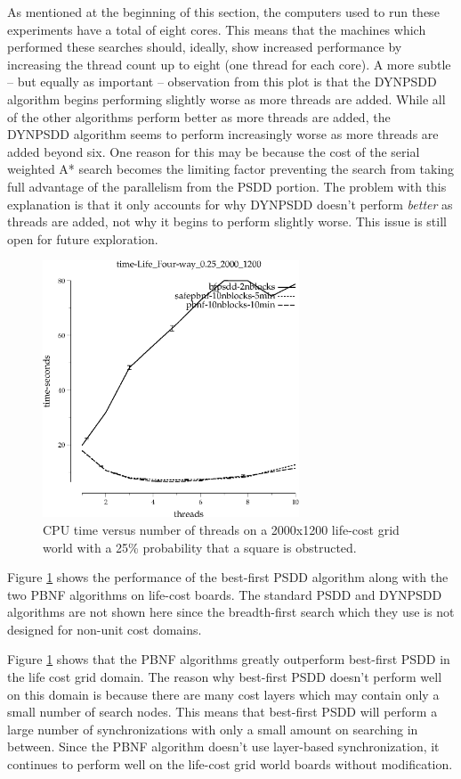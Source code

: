 \documentclass{article}
\begin{document}
As mentioned at the beginning of this section, the computers used to
run these experiments have a total of eight cores.  This means that
the machines which performed these searches should, ideally, show
increased performance by increasing the thread count up to eight (one
thread for each core).  A more subtle -- but equally as important --
observation from this plot is that the DYNPSDD algorithm begins
performing slightly worse as more threads are added.  While all of the
other algorithms perform better as more threads are added, the DYNPSDD
algorithm seems to perform increasingly worse as more threads are
added beyond six.  One reason for this may be because the cost of the
serial weighted A* search becomes the limiting factor preventing the
search from taking full advantage of the parallelism from the PSDD
portion.  The problem with this explanation is that it only accounts
for why DYNPSDD doesn't perform \emph{better} as threads are added,
not why it begins to perform slightly worse.  This issue is still open
for future exploration.

\begin{figure}[t]
\includegraphics[width=3in]{../graphs/grid_life_four-way_0.25_2000_1200/time-Life_Four-way_0.25_2000_1200.eps}
\caption{CPU time versus number of threads on a 2000x1200 life-cost
  grid world with a 25\% probability that a square is obstructed.}
\label{fig:grid-life}
\end{figure}

Figure \ref{fig:grid-life} shows the performance of the best-first
PSDD algorithm along with the two PBNF algorithms on life-cost
boards.  The standard PSDD and DYNPSDD algorithms are not shown here
since the breadth-first search which they use is not designed for
non-unit cost domains.

Figure \ref{fig:grid-life} shows that the PBNF algorithms greatly
outperform best-first PSDD in the life cost grid domain.  The reason
why best-first PSDD doesn't perform well on this domain is because
there are many cost layers which may contain only a small number of
search nodes.  This means that best-first PSDD will perform a large
number of synchronizations with only a small amount on searching
in between.  Since the PBNF algorithm doesn't use layer-based
synchronization, it continues to perform well on the life-cost grid
world boards without modification.
\end{document}
